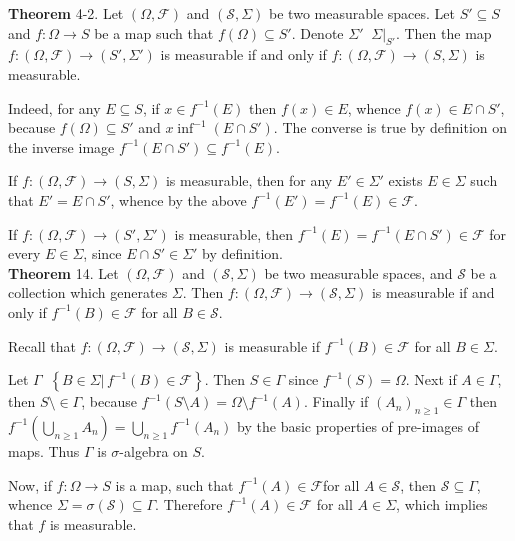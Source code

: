 \documentclass[a4paper]{article}
\newcommand{\obj}[1]{\left\{ #1 \right \}}
\newcommand{\brac}[1]{\left ( #1 \right )}
\newcommand{\induc}[1]{\left . #1 \right \vert}
\newcommand{\Scal}{\mathcal{S}}
\newcommand{\Fcal}{\mathcal{F}}
\newcommand{\defn}{\mathop{\overset{\Delta}{=}}\nolimits}
\begin{document}
\label{thm:meas_generating} \noindent \textbf{Theorem} 4-2.
Let $\brac{\Omega, \Fcal}$ and $\brac{\Scal, \Sigma}$ be two measurable spaces. Let $S'\subseteq S$ and $f:\Omega\to S$ be a map such that $f\brac{\Omega}\subseteq S'$. Denote $\Sigma'\defn \induc{\Sigma}_{S'}$. Then the map $f:\brac{\Omega, \Fcal}\to\brac{S',\Sigma'}$ is measurable if and only if $f:\brac{\Omega, \Fcal}\to\brac{S, \Sigma}$ is measurable.

Indeed, for any $E\subseteq S$, if $x\in f^{-1}\brac{E}$ then $f\brac{x}\in E$, whence $f\brac{x}\in E\cap S'$, because $f\brac{\Omega}\subseteq S'$ and $x\inf^{-1}\brac{E\cap S'}$. The converse is true by definition on the inverse image $f^{-1}\brac{E\cap S'}\subseteq f^{-1}\brac{E}$.

If $f:\brac{\Omega, \Fcal}\to\brac{S, \Sigma}$ is measurable, then for any $E'\in \Sigma'$ exists $E\in \Sigma$ such that $E'=E\cap S'$, whence by the above $f^{-1}\brac{E'} = f^{-1}\brac{E} \in \Fcal$.

If $f:\brac{\Omega, \Fcal}\to\brac{S', \Sigma'}$ is measurable, then $f^{-1}\brac{E} = f^{-1}\brac{E\cap S'} \in \Fcal$ for every $E\in \Sigma$, since $E\cap S'\in \Sigma'$ by definition.\\

\label{thm:measurability1} \noindent \textbf{Theorem} 14.
Let $\brac{\Omega,\Fcal}$ and $\brac{\Scal,\Sigma}$ be two measurable spaces, and $\Scal$ be a collection which generates $\Sigma$. Then $f:\brac{\Omega, \Fcal}\to\brac{\Scal, \Sigma}$ is measurable if and only if $f^{-1}\brac{B}\in\Fcal$ for all $B\in\Scal$.

Recall that $f:\brac{\Omega, \Fcal}\to\brac{\Scal, \Sigma}$ is measurable if $f^{-1}\brac{B} \in \Fcal$ for all $B\in \Sigma$.

Let $\Gamma\defn\obj{\induc{B\in\Sigma}\,f^{-1}\brac{B}\in\Fcal}$. Then $S\in\Gamma$ since $f^{-1}\brac{S}=\Omega$. Next if $A\in\Gamma$, then $S\setminus\in\Gamma$, because $f^{-1}\brac{S\setminus A} = \Omega\setminus f^{-1}\brac{A}$. Finally if $\brac{A_n}_{n\geq1}\in\Gamma$ then $f^{-1}\brac{\bigcup_{n\geq1} A_n}=\bigcup_{n\geq1} f^{-1}\brac{A_n}$ by the basic properties of pre-images of maps. Thus $\Gamma$ is $\sigma$-algebra on $S$.

Now, if $f:\Omega\to S$ is a map, such that $f^{-1}\brac{A}\in \Fcal$for all $A\in \Scal$, then $\Scal\subseteq\Gamma$, whence $\Sigma=\sigma\brac{\Scal}\subseteq\Gamma$. Therefore $f^{-1}\brac{A}\in\Fcal$ for all $A\in \Sigma$, which implies that $f$ is measurable. 
\end{document}
